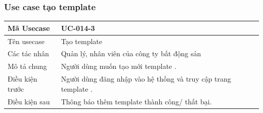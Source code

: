 \documentclass[12pt,a4paper]{article}
\begin{document}
    \subsubsection*{Use case tạo template }
    \begin{table}[H]
        \centering
        \begin{tabular}{|p{3.5cm}|p{11.5cm}|c|}
            \hline
            Mã Usecase      & UC-014-3                                                       \\
            \hline
            Tên usecase     & Tạo template                                                   \\
            \hline
            Các tác nhân    & Quản lý, nhân viên của công ty bất động sản                    \\
            \hline
            Mô tả chung     & Người dùng muốn tạo mới template .                             \\
            \hline

            Điều kiện trước & Người dùng đăng nhập vào hệ thống và truy cập trang template . \\
            \hline

            Điều kiện sau   & Thông báo thêm template thành công/ thất bại.                  \\
            \hline


\end{tabular}
\end{table}
\end{document}
